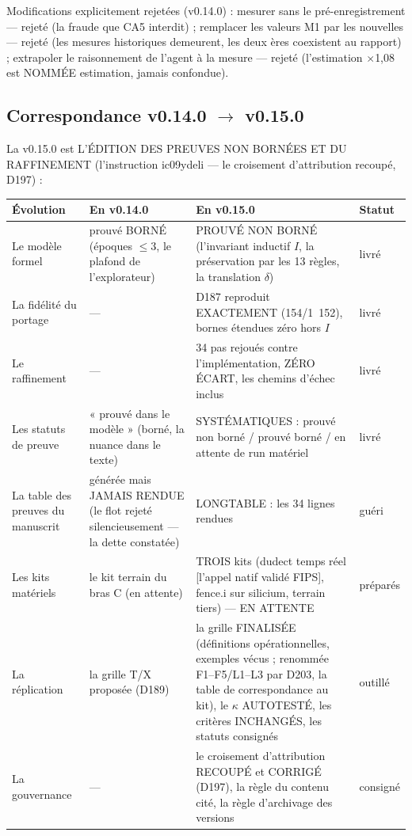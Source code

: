 Modifications explicitement rejetées (v0.14.0) : mesurer sans le
pré-enregistrement — rejeté (la fraude que CA5 interdit) ; remplacer les
valeurs M1 par les nouvelles — rejeté (les mesures historiques demeurent,
les deux ères coexistent au rapport) ; extrapoler le raisonnement de
l'agent à la mesure — rejeté (l'estimation $\times$1,08 est NOMMÉE
estimation, jamais confondue).

\subsection{Correspondance v0.14.0 $\to$ v0.15.0}\label{sec:evolutions150}

La v0.15.0 est L'ÉDITION DES PREUVES NON BORNÉES ET DU RAFFINEMENT
(l'instruction ic09ydeli — le croisement d'attribution recoupé, D197) :

\begin{table}[h]\centering\small
\begin{tabularx}{\textwidth}{@{}l X X l@{}}
\toprule
Évolution & En v0.14.0 & En v0.15.0 & Statut \\
\midrule
Le modèle formel & prouvé BORNÉ (époques $\le 3$, le plafond de
l'explorateur) & PROUVÉ NON BORNÉ (l'invariant inductif $I$, la
préservation par les 13 règles, la translation $\delta$) & livré \\
La fidélité du portage & — & D187 reproduit EXACTEMENT (154/1~152),
bornes étendues zéro hors $I$ & livré \\
Le raffinement & — & 34 pas rejoués contre l'implémentation, ZÉRO
ÉCART, les chemins d'échec inclus & livré \\
Les statuts de preuve & « prouvé dans le modèle » (borné, la nuance
dans le texte) & SYSTÉMATIQUES : prouvé non borné / prouvé borné / en
attente de run matériel & livré \\
La table des preuves du manuscrit & générée mais JAMAIS RENDUE (le
flot rejeté silencieusement — la dette constatée) & LONGTABLE : les 34
lignes rendues & guéri \\
Les kits matériels & le kit terrain du bras C (en attente) & TROIS kits
(dudect temps réel [l'appel natif validé FIPS], fence.i sur silicium,
terrain tiers) — EN ATTENTE & préparés \\
La réplication & la grille T/X proposée (D189) & la grille FINALISÉE
(définitions opérationnelles, exemples vécus ; renommée F1--F5/L1--L3
par D203, la table de correspondance au kit), le $\kappa$ AUTOTESTÉ,
les critères INCHANGÉS, les statuts consignés & outillé \\
La gouvernance & — & le croisement d'attribution RECOUPÉ et CORRIGÉ
(D197), la règle du contenu cité, la règle d'archivage des versions &
consigné \\
\bottomrule
\end{tabularx}
\end{table}

